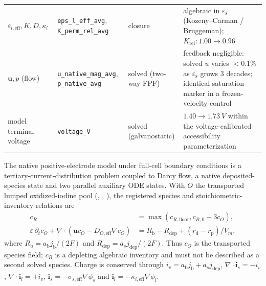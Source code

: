\documentclass[11pt]{article}
\newcommand{\epss}{\varepsilon_{\mathrm{s}}}
\begin{document}
\begin{table}[tb]
\begin{tabular}{@{}p{2.3cm}p{3.2cm}p{1.9cm}p{4.9cm}@{}}
$\varepsilon_{l,\mathrm{eff}},K,D,\kappa_l$ & \texttt{eps\_l\_eff\_avg}, \texttt{K\_perm\_rel\_avg} & closure & algebraic in $\epss$ (Kozeny--Carman / Bruggeman); $K_{\mathrm{rel}}:1.00\!\to\!0.96$\\
$\mathbf{u},p$ (flow) & \texttt{u\_native\_mag\_avg}, \texttt{p\_native\_avg} & solved (two-way FPF) & feedback negligible: solved $u$ varies $<\!0.1\%$ as $\epss$ grows $3$ decades; identical saturation marker in a frozen-velocity control\\
model terminal voltage & \texttt{voltage\_V} & solved (galvanostatic) & $1.40\!\to\!1.73~\si{V}$ within the voltage-calibrated accessibility parameterization\\
\bottomrule
\end{tabular}
\end{table}


The native positive-electrode model under full-cell boundary conditions is a tertiary-current-distribution
problem coupled to Darcy flow, a native deposited-species state and two parallel auxiliary ODE states. With
$O$ the transported lumped oxidized-iodine pool (, , ), the registered species
and stoichiometric-inventory relations are
\begin{align}
c_R&=\max(c_{R,\mathrm{floor}},c_{R,0}-3c_O),\\
\varepsilon\,\partial_t c_O+\nabla\!\cdot(\mathbf{u}c_O-D_{O,\mathrm{eff}}\nabla c_O)
&=R_{\mathrm b}-R_{\mathrm{dep}}+(r_{\mathrm d}-r_{\mathrm p})/V_m,
\end{align}
where $R_{\mathrm b}=a_{\mathrm b}j_{\mathrm b}/(2F)$ and
$R_{\mathrm{dep}}=a_sj_{\mathrm{dep}}/(2F)$. Thus $c_O$ is the transported species field; $c_R$ is a
depleting algebraic inventory and must not be described as a second solved species. Charge is conserved through
$i_v=a_{\mathrm b}j_{\mathrm b}+a_sj_{\mathrm{dep}}$,
$\nabla\!\cdot\mathbf{i}_s=-i_v$, $\nabla\!\cdot\mathbf{i}_l=+i_v$,
$\mathbf{i}_s=-\sigma_{s,\mathrm{eff}}\nabla\phi_s$ and
$\mathbf{i}_l=-\kappa_{l,\mathrm{eff}}\nabla\phi_l$.
\end{document}
